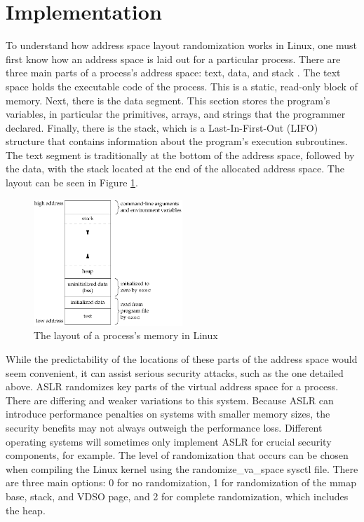 \section{Implementation}
\label{s:implementation} %

To understand how address space layout randomization works in Linux, one must first know how an address space is laid out for a particular process. There are three main parts of a process’s address space: text, data, and stack \cite{memorylayout}. The text space holds the executable code of the process. This is a static, read-only block of memory. Next, there is the data segment. This section stores the program’s variables, in particular the primitives, arrays, and strings that the programmer declared. Finally, there is the stack, which is a Last-In-First-Out (LIFO) structure that contains information about the program’s execution subroutines. The text segment is traditionally at the bottom of the address space, followed by the data, with the stack located at the end of the allocated address space. The layout can be seen in Figure \ref{f:memory_layout}.

\begin{figure}[h]
\centering %
\includegraphics[width=0.5\textwidth]{figures/Memory-Layout.png}
\caption{The layout of a process's memory in Linux \cite{memorylayout}}
\label{f:memory_layout}
\end{figure}

While the predictability of the locations of these parts of the address space would seem convenient, it can assist serious security attacks, such as the one detailed above. ASLR randomizes key parts of the virtual address space for a process. There are differing and weaker variations to this system. Because ASLR can introduce performance penalties on systems with smaller memory sizes, the security benefits may not always outweigh the performance loss. Different operating systems will sometimes only implement ASLR for crucial security components, for example. The level of randomization that occurs can be chosen when compiling the Linux kernel using the randomize\_va\_space sysctl file. There are three main options: 0 for no randomization, 1 for randomization of the mmap base, stack, and VDSO page, and 2 for complete randomization, which includes the heap. \cite{kerneldocs}

